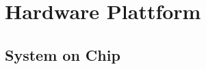 \clearpage
\section{Hardware Plattform}\label{sec:HardwarePlattform}


\subsection{System on Chip}\label{sec:SystemonChip}
